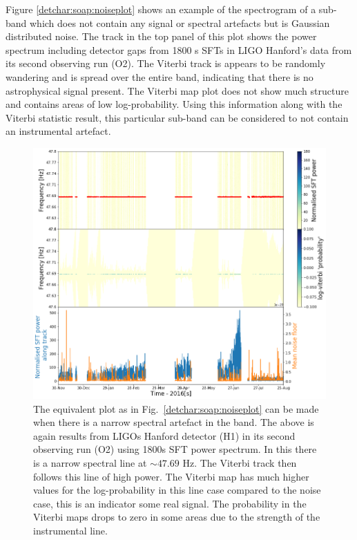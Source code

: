 %
Figure \ref{detchar:soap:noiseplot} shows an example of the spectrogram of a
sub-band which does not contain any signal or spectral artefacts but is
Gaussian distributed noise.  The track in the top panel of this plot shows the
power spectrum including detector gaps from 1800 s \glspl{SFT} in \gls{LIGO}
Hanford's data from its second observing run (O2).  The Viterbi track is
appears to be randomly wandering and is spread over the entire band, indicating that there is no astrophysical signal
present. 
 The Viterbi map plot does not show much
structure and contains areas of low log-probability.  Using this information
along with the Viterbi statistic result, this particular sub-band can be
considered to not contain an instrumental artefact. 
%
\begin{figure}[hpt]
	\centering
	\includegraphics[width=\textwidth]{C5_detchar/track_F47_6_47_8_linenarrow.png}
	\caption[Example SOAP output for string narrow instrumental line.]{The equivalent plot as in Fig.~\ref{detchar:soap:noiseplot} can be made when there is a narrow spectral artefact in the band. The above is again results from \glspl{LIGO} Hanford detector (H1) in its second observing run (O2) using 1800s \gls{SFT} power spectrum. In this there is a narrow spectral line at $\sim 47.69$ Hz. The Viterbi track then follows this line of high power. The Viterbi map has much higher values for the log-probability in this line case compared to the noise case, this is an indicator some real signal. The probability in the Viterbi maps drops to zero in some areas due to the strength of the instrumental line. }
	\label{detchar:soap:lineplot}
\end{figure}
%

